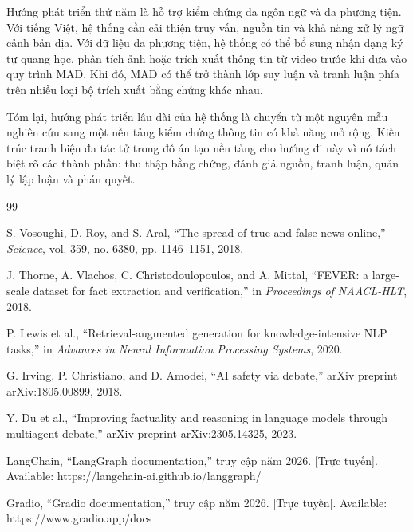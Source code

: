 ﻿\documentclass[oneside,a4paper,12pt]{extreport}
\begin{document}
Hướng phát triển thứ năm là hỗ trợ kiểm chứng đa ngôn ngữ và đa phương tiện. Với tiếng Việt, hệ thống cần cải thiện truy vấn, nguồn tin và khả năng xử lý ngữ cảnh bản địa. Với dữ liệu đa phương tiện, hệ thống có thể bổ sung nhận dạng ký tự quang học, phân tích ảnh hoặc trích xuất thông tin từ video trước khi đưa vào quy trình MAD. Khi đó, MAD có thể trở thành lớp suy luận và tranh luận phía trên nhiều loại bộ trích xuất bằng chứng khác nhau.

Tóm lại, hướng phát triển lâu dài của hệ thống là chuyển từ một nguyên mẫu nghiên cứu sang một nền tảng kiểm chứng thông tin có khả năng mở rộng. Kiến trúc tranh biện đa tác tử trong đồ án tạo nền tảng cho hướng đi này vì nó tách biệt rõ các thành phần: thu thập bằng chứng, đánh giá nguồn, tranh luận, quản lý lập luận và phán quyết.

\begin{thebibliography}{99}

S. Vosoughi, D. Roy, and S. Aral, ``The spread of true and false news online,'' \textit{Science}, vol. 359, no. 6380, pp. 1146--1151, 2018.

J. Thorne, A. Vlachos, C. Christodoulopoulos, and A. Mittal, ``FEVER: a large-scale dataset for fact extraction and verification,'' in \textit{Proceedings of NAACL-HLT}, 2018.

P. Lewis et al., ``Retrieval-augmented generation for knowledge-intensive NLP tasks,'' in \textit{Advances in Neural Information Processing Systems}, 2020.

G. Irving, P. Christiano, and D. Amodei, ``AI safety via debate,'' arXiv preprint arXiv:1805.00899, 2018.

Y. Du et al., ``Improving factuality and reasoning in language models through multiagent debate,'' arXiv preprint arXiv:2305.14325, 2023.

LangChain, ``LangGraph documentation,'' truy cập năm 2026. [Trực tuyến]. Available: https://langchain-ai.github.io/langgraph/

Gradio, ``Gradio documentation,'' truy cập năm 2026. [Trực tuyến]. Available: https://www.gradio.app/docs

\end{thebibliography}
\end{document}

